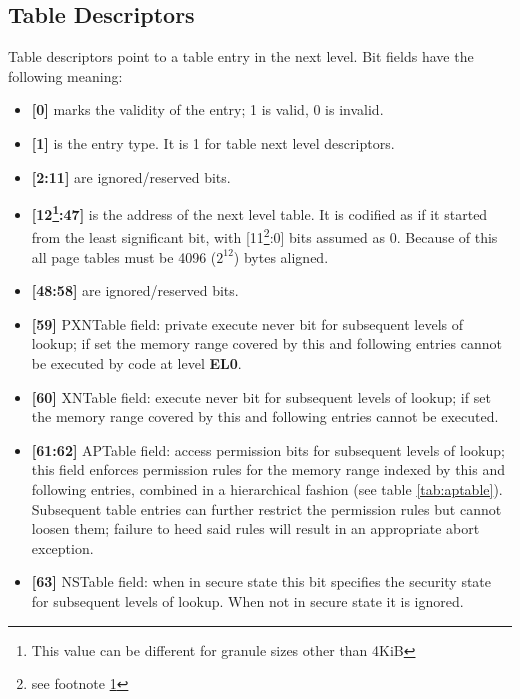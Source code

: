 \documentclass[12pt,a4paper,openright,twoside]{report}
\begin{document}
\subsection{Table Descriptors}
Table descriptors point to a table entry in the next level. Bit fields have the 
following meaning:
\begin{itemize}
    \item \textbf{[0]} marks the validity of the entry; 1 is valid, 0 is invalid.
    \item \textbf{[1]} is the entry type. It is 1 for table next level descriptors.
    \item \textbf{[2:11]} are ignored/reserved bits.
    \item \textbf{[12\footnote{\label{4knote} This value can be different for granule
        sizes other than 4KiB}:47]} is the address of the next level table. It is codified
        as if it started from the least significant bit, with 
        [11\footnote{see footnote \ref{4knote}}:0] bits assumed
        as 0. Because of this all page tables must be 4096 ($2^12$) bytes aligned.
    \item \textbf{[48:58]} are ignored/reserved bits.
    \item \textbf{[59]} PXNTable field: private execute never bit for subsequent
        levels of lookup; if set the memory range covered by this and following entries
        cannot be executed by code at level \textbf{EL0}.
    \item \textbf{[60]} XNTable field: execute never bit for subsequent levels
        of lookup; if set the memory range covered by this and following entries
        cannot be executed.
    \item \textbf{[61:62]} APTable field: access permission bits for subsequent levels
        of lookup; this field enforces permission rules for the memory range
        indexed by this and following entries, combined in a hierarchical 
        fashion (see table \ref{tab:aptable}). Subsequent table entries can
        further restrict the permission rules but cannot loosen them; failure
        to heed said rules will result in an appropriate abort exception.
    \item \textbf{[63]} NSTable field: when in secure state this bit specifies
        the security state for subsequent levels of lookup. When not in secure state
        it is ignored.
\end{itemize}
\end{document}
